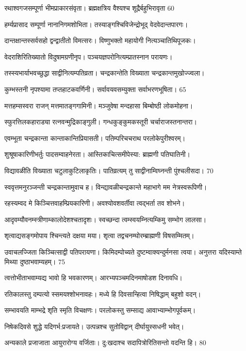  रथाश्वगजसम्पूर्णा भीमप्राकारसंवृता।
ब्रह्मक्षत्रिय वैश्यश्च शूद्रैर्बहुभिरावृता 60

 हर्म्यप्रासाद सम्पूर्णा नानानिगमशोभिता।
 तस्याङ्गश्चिविजेन्द्रोभूद् वेदवेदान्तपारगः।

 दान्तक्षान्तस्सर्वसहो द्वन्द्वातीतो विमत्सरः।
 विष्णुभक्तो महायोगी नित्यञ्चातिथिपूजकः।

 वेदराशिरितिख्यातो विदुषामग्रणीनृप।
 पञ्चयज्ञपरोनित्यम्प्रातस्नान परायणः।

 तस्स्यभार्याभवच्छुद्धा साद्वीनित्यम्पतिव्रता।
 चन्द्रकान्तेति विख्याता चन्द्रकान्तमुखोज्ज्वला।

 कुम्भस्तनी नृपश्यामा तप्तहाटकवर्णिनी।
 सर्वावयवसम्युक्ता सर्वाभरणभूषिता। 65

  मत्तहम्सस्वरा राजन् मत्तमातङ्गगामिनी।
 मञ्जुवेषा मन्दहासा बिम्बोष्ठी लोकमोहना।

 स्फुरत्तिलकहाराड्या रत्नवन्मुद्रिकाङ्गुली।
 गन्धकुङ्कुमकस्तूरी चर्चाराजस्तनान्तरा।

 एवम्भूता चन्द्रकान्ता कान्ताकान्तिप्रियासती।
 पतिम्परिचचराथ परलोकेपुरीश्वरम्।

 शुश्रूषाकारिणीभर्तुः पादसम्वाहनेरता।
 आस्तिकाचित्समीपेस्या: ब्राह्मणी पतिघातिनी।

 विद्यावळीति विख्याता चटुलाकुटिलाकृतिः।
 पातिव्रत्यम् तु साद्वीनाम्विघ्नन्ती पुंश्चलीसदा। 70

  स्ववृत्तमनुरञ्जन्ती चन्द्रकान्तामुवाच ह।
विन्द्यावळीचन्द्रकान्ते महाभागे मम नेत्रस्वरूपिणी।

 रहस्यम्वद मे किञ्चित्तवाहम्प्रियकारिणी।
 अवश्योवशवर्तीवा त्वद्भर्ता तव शोभने।

 आदृवम्यौवनम्स्त्रीणाम्कालोदेशश्चतादृशः।
 स्वच्छन्दा त्वम्स्वयम्नित्यम्किमु सम्भोग लालसा।

 शृत्वाद्यसङ्गमोपाय श्चिन्त्यते दक्षया मया।
 शृत्वा तद्वचनम्घोरम्ब्राह्मणी विषसम्मितम्।

 उवाचलज्जिता किञ्चित्साद्वी पतिपरायणा।
 किमिदम्पोच्यते दुष्टम्वाक्यन्दुर्मनसा त्वया।
 अनुत्तरा यदिस्याम्ते मिथ्या दुष्ठाभवाम्यहम्। 75

  त्वत्तोभीताभवाम्यद्य भावो हि भवकारणम्।
 आरभ्यपञ्चमदिनमाषोडश दिनावधि।

 रतिकालस्तु दम्पत्यो स्समयश्शोभनावहः।
 मध्ये हि दिवसान्हित्वा निषिद्धाम् बहुशो वदन्।

 सम्भावयति माम्भद्रे शृति स्मृति विचक्षणः।
 परलोकस्तु सम्साद्य आवाभ्याम्भोगपूर्वकम्।

 निषेकदिवसे शुद्धे यदिगर्भ:प्रजायते।
 उत्पन्नश्च सुतोविद्वान् दीर्घायुस्सधनी भवेत्।

 अन्यकाले प्रजाजाता आयुरारोग्य वर्जिताः।
 दु:खदाश्च सदापित्रोरितिसन्तो वदन्ति हि। 80

